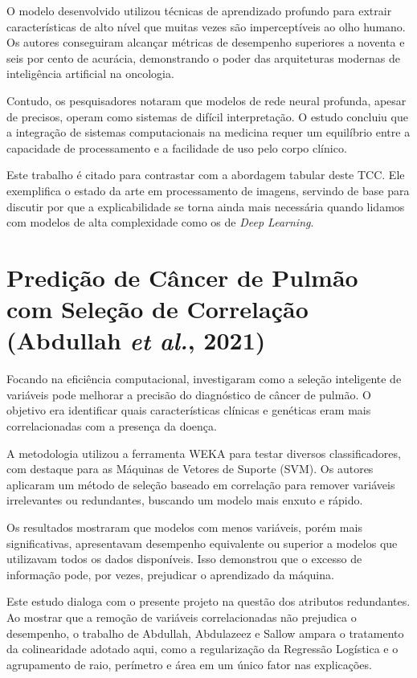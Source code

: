 \documentclass[
    12pt
    ,oneside
    ,a4paper
    ,chapter=TITLE
    ,section=TITLE
    ,sumario=abnt-6027-2012
    ,english,brazil]{abntex2} %
\begin{document}
O modelo desenvolvido utilizou técnicas de aprendizado profundo para extrair características de alto nível que muitas vezes são imperceptíveis ao olho humano. Os autores conseguiram alcançar métricas de desempenho superiores a noventa e seis por cento de acurácia, demonstrando o poder das arquiteturas modernas de inteligência artificial na oncologia.

Contudo, os pesquisadores notaram que modelos de rede neural profunda, apesar de precisos, operam como sistemas de difícil interpretação. O estudo concluiu que a integração de sistemas computacionais na medicina requer um equilíbrio entre a capacidade de processamento e a facilidade de uso pelo corpo clínico.

Este trabalho é citado para contrastar com a abordagem tabular deste TCC. Ele exemplifica o estado da arte em processamento de imagens, servindo de base para discutir por que a explicabilidade se torna ainda mais necessária quando lidamos com modelos de alta complexidade como os de \textit{Deep Learning}.

\section{Predição de Câncer de Pulmão com Seleção de Correlação (Abdullah \textit{et al.}, 2021)}

Focando na eficiência computacional,  investigaram como a seleção inteligente de variáveis pode melhorar a precisão do diagnóstico de câncer de pulmão. O objetivo era identificar quais características clínicas e genéticas eram mais correlacionadas com a presença da doença.

A metodologia utilizou a ferramenta WEKA para testar diversos classificadores, com destaque para as Máquinas de Vetores de Suporte (SVM). Os autores aplicaram um método de seleção baseado em correlação para remover variáveis irrelevantes ou redundantes, buscando um modelo mais enxuto e rápido.

Os resultados mostraram que modelos com menos variáveis, porém mais significativas, apresentavam desempenho equivalente ou superior a modelos que utilizavam todos os dados disponíveis. Isso demonstrou que o excesso de informação pode, por vezes, prejudicar o aprendizado da máquina.

Este estudo dialoga com o presente projeto na questão dos atributos redundantes. Ao mostrar que a remoção de variáveis correlacionadas não prejudica o desempenho, o trabalho de Abdullah, Abdulazeez e Sallow ampara o tratamento da colinearidade adotado aqui, como a regularização da Regressão Logística e o agrupamento de raio, perímetro e área em um único fator nas explicações.
\end{document}
